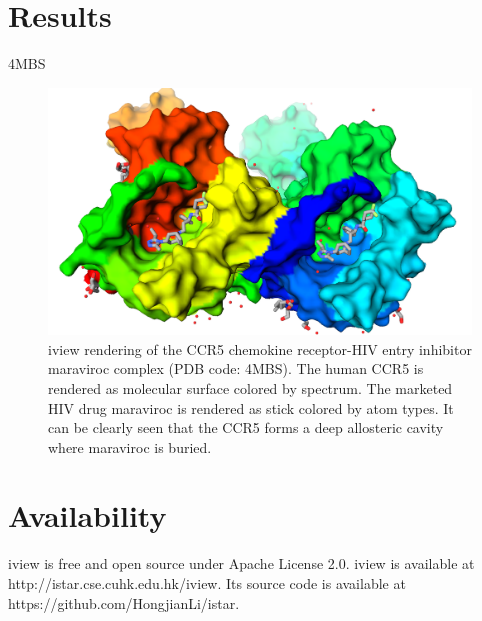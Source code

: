 \documentclass{bioinfo}
\begin{document}
\begin{methods}
\end{methods}

\section{Results}

4MBS \citep{1348}

\begin{figure}%
\centerline{\includegraphics[width=\linewidth]{4MBS.png}}
\caption{iview rendering of the CCR5 chemokine receptor-HIV entry inhibitor maraviroc complex (PDB code: 4MBS). The human CCR5 is rendered as molecular surface colored by spectrum. The marketed HIV drug maraviroc is rendered as stick colored by atom types. It can be clearly seen that the CCR5 forms a deep allosteric cavity where maraviroc is buried.}\label{fig:4MBS}
\end{figure}

\section{Availability}

iview is free and open source under Apache License 2.0. iview is available at http://istar.cse.cuhk.edu.hk/iview. Its source code is available at https://github.com/HongjianLi/istar.




%
%
%
%
%
%


\end{document}
